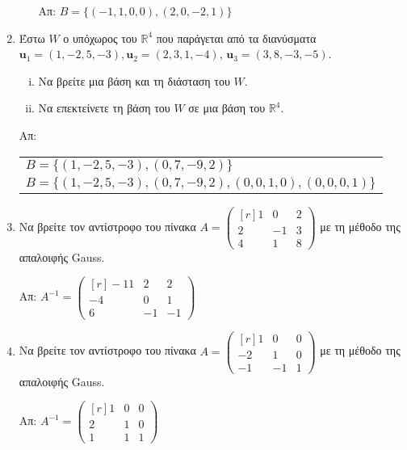 \begin{enumerate}
\begin{enumerate}[(i)]
                \hfill Απ: $ B = \{ (-1,1,0,0), (2,0,-2,1) \} $ 
        \end{enumerate}

    \item Έστω $ W $ ο υπόχωρος του $\mathbb{R}^{4}$ που παράγεται από τα διανύσματα $ \mathbf{u}
        _{1} = (1,-2,5,-3), \mathbf{u}_{2} = (2,3,1,-4) $, $ \mathbf{u}_{3} = (3,8,-3,-5) $.
        \begin{enumerate}[(i)]
            \item Να βρείτε μια βάση και τη διάσταση του $ W $.
            \item Να επεκτείνετε τη βάση του $ W $ σε μια βάση του $ \mathbb{R}^{4} $.
        \end{enumerate}

        \hfill Απ:  \begin{tabular}{l}
            $B = \{ (1,-2,5,-3), (0,7,-9,2) \}$ \\
            $ B = \{ (1,-2,5,-3), (0,7,-9,2), (0,0,1,0), (0,0,0,1) \} $
        \end{tabular} 

    \item Να βρείτε τον αντίστροφο του πίνακα $ A = 
        \begin{pmatrix*}[r]
            1 & 0 & 2 \\
            2 & -1 & 3 \\
            4 & 1 & 8
        \end{pmatrix*}$ με τη μέθοδο της απαλοιφής Gauss.

        \hfill Απ: $ A^{-1} = 
        \begin{pmatrix*}[r]
            -11 & 2 & 2 \\
            -4 & 0 & 1 \\
            6 & -1 & -1
        \end{pmatrix*} $ 

    \item Να βρείτε τον αντίστροφο του πίνακα $ A = 
        \begin{pmatrix*}[r]
            1 & 0 & 0 \\
            -2 & 1 & 0 \\
            -1 & -1 & 1
        \end{pmatrix*}$ με τη μέθοδο της απαλοιφής Gauss.

        \hfill Απ: $ A^{-1} = 
        \begin{pmatrix*}[r]
            1 & 0 & 0 \\
            2 & 1 & 0 \\
            1 & 1 & 1
        \end{pmatrix*}$



\end{enumerate}



